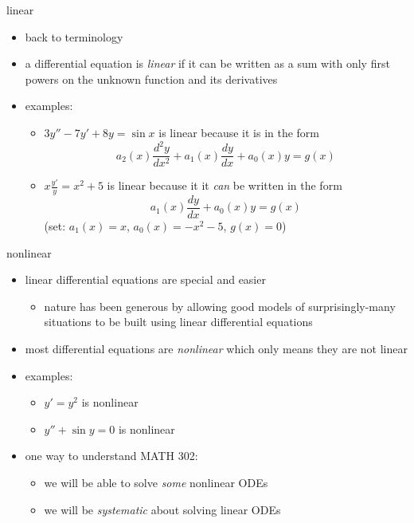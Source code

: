 \documentclass{beamer}
\begin{document}
\begin{frame}{linear}

\begin{itemize}
\item back to terminology
\item a differential equation is \alert{\emph{linear}} if it can be written as a sum with only first powers on the unknown function and its derivatives
\item examples:
    \begin{itemize}
    \item $3 y'' - 7 y' + 8 y = \sin x$ is linear because it is in the form
        $$a_2(x) \frac{d^2y}{dx^2} + a_1(x) \frac{dy}{dx} + a_0(x) y = g(x)$$
    \item $x \frac{y'}{y} = x^2 + 5$ is linear because it it \emph{can} be written in the form
        $$a_1(x) \frac{dy}{dx} + a_0(x) y = g(x)$$
    (set: $a_1(x)=x$, $a_0(x)=-x^2-5$, $g(x)=0$)
    \end{itemize}
\end{itemize}
\end{frame}


\begin{frame}{nonlinear}

\begin{itemize}
\item linear differential equations are special and easier
    \begin{itemize}
    \item nature has been generous by allowing good models of surprisingly-many situations to be built using linear differential equations
    \end{itemize}
\item most differential equations are \emph{nonlinear} which only means they are not linear
\item examples:
    \begin{itemize}
    \item $y' = y^2$ is nonlinear
    \item $y'' + \sin y =0$ is nonlinear
    \end{itemize}
\item one way to understand MATH 302:
    \begin{itemize}
    \item we will be able to solve \emph{some} nonlinear ODEs
    \item we will be \emph{systematic} about solving linear ODEs
    \end{itemize}
\end{itemize}
\end{frame}
\end{document}
